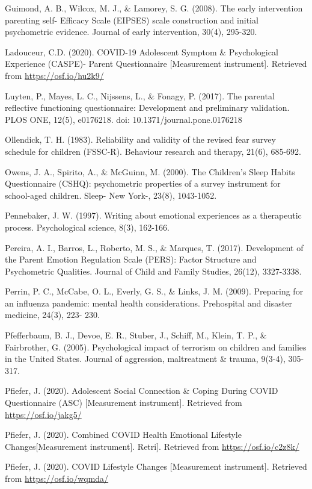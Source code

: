 \documentclass[]{book}
\begin{document}
Guimond, A. B., Wilcox, M. J., \& Lamorey, S. G. (2008). The early intervention parenting self-
Efficacy Scale (EIPSES) scale construction and initial psychometric evidence. Journal of
early intervention, 30(4), 295-320.

Ladouceur, C.D. (2020). COVID-19 Adolescent Symptom \& Psychological Experience (CASPE)-
Parent Questionnaire {[}Measurement instrument{]}. Retrieved from \url{https://osf.io/hu2k9/}

Luyten, P., Mayes, L. C., Nijssens, L., \& Fonagy, P. (2017). The parental reflective functioning
questionnaire: Development and preliminary validation. PLOS ONE, 12(5), e0176218.
doi: 10.1371/journal.pone.0176218

Ollendick, T. H. (1983). Reliability and validity of the revised fear survey schedule for children
(FSSC-R). Behaviour research and therapy, 21(6), 685-692.

Owens, J. A., Spirito, A., \& McGuinn, M. (2000). The Children's Sleep Habits Questionnaire
(CSHQ): psychometric properties of a survey instrument for school-aged children. Sleep-
New York-, 23(8), 1043-1052.

Pennebaker, J. W. (1997). Writing about emotional experiences as a therapeutic
process. Psychological science, 8(3), 162-166.

Pereira, A. I., Barros, L., Roberto, M. S., \& Marques, T. (2017). Development of the Parent
Emotion Regulation Scale (PERS): Factor Structure and Psychometric Qualities. Journal
of Child and Family Studies, 26(12), 3327-3338.

Perrin, P. C., McCabe, O. L., Everly, G. S., \& Links, J. M. (2009). Preparing for an influenza
pandemic: mental health considerations. Prehospital and disaster medicine, 24(3), 223-
230.

Pfefferbaum, B. J., Devoe, E. R., Stuber, J., Schiff, M., Klein, T. P., \& Fairbrother, G. (2005).
Psychological impact of terrorism on children and families in the United States. Journal
of aggression, maltreatment \& trauma, 9(3-4), 305-317.

Pfiefer, J. (2020). Adolescent Social Connection \& Coping During COVID Questionnaire (ASC)
{[}Measurement instrument{]}. Retrieved from \url{https://osf.io/jakg5/}

Pfiefer, J. (2020). Combined COVID Health Emotional Lifestyle Changes{[}Measurement
instrument{]}. Retri{]}. Retrieved from \url{https://osf.io/c2z8k/}

Pfiefer, J. (2020). COVID Lifestyle Changes {[}Measurement instrument{]}. Retrieved from
\url{https://osf.io/wqmda/}
\end{document}
